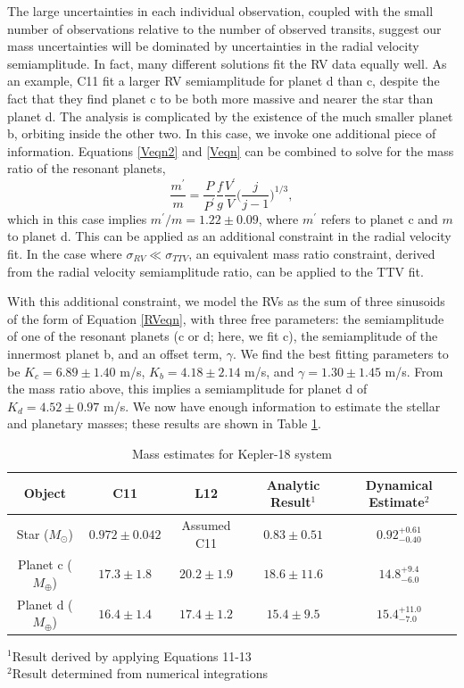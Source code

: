 The large uncertainties in each individual observation, coupled with the small number of observations relative to the number of observed transits, suggest our mass uncertainties will be dominated by uncertainties in the radial velocity semiamplitude. In fact, many different solutions fit the RV data equally well. As an example, C11 fit a larger RV semiamplitude for planet d than c, despite the fact that they find planet c to be both more massive and nearer the star than planet d. The analysis is complicated by the existence of the much smaller planet b, orbiting inside the other two. In this case, we invoke one additional piece of information. Equations \ref{Veqn2} and \ref{Veqn} can be combined to solve for the mass ratio of the resonant planets, 
\begin{equation}
\frac{m^\prime}{m} = \frac{P}{P^\prime} \frac{f}{g} \frac{V^\prime}{V} \bigg(\frac{j}{j-1}\bigg)^{1/3},
\label{Mratio}
\end{equation}
which in this case implies $m^\prime/m = 1.22 \pm 0.09$, where $m^\prime$ refers to planet c and $m$ to planet d. This can be applied as an additional constraint in the radial velocity fit. In the case where $\sigma_{RV} \ll \sigma_{TTV}$, an equivalent mass ratio constraint, derived from the radial velocity semiamplitude ratio, can be applied to the TTV fit. 

With this additional constraint, we model the RVs as the sum of three sinusoids of the form of Equation \ref{RVeqn}, with three free parameters: the semiamplitude of one of the resonant planets (c or d; here, we fit c), the semiamplitude of the innermost planet b, and an offset term, $\gamma$. We find the best fitting parameters to be $K_c = 6.89 \pm 1.40$ m/s, $K_b = 4.18 \pm 2.14$ m/s, and $\gamma = 1.30 \pm 1.45$ m/s. From the mass ratio above, this implies a semiamplitude for planet d of $K_d = 4.52 \pm 0.97$ m/s. We now have enough information to estimate the stellar and planetary masses; these results are shown in Table \ref{ExampRes}. 

\begin{table}[hbt!]
\footnotesize
\begin{center}
\begin{tabular}{ccccc}
\hline
Object & C11 & L12 & Analytic Result$^{1}$ & Dynamical Estimate$^2$ \\
\hline
        Star ($M_\odot$) & $0.972 \pm 0.042$ & Assumed C11 &  $0.83 \pm 0.51$ & $0.92 ^{+ 0.61} _{-0.40}$ \\
        Planet c ($M_\oplus$) & $17.3 \pm 1.8$ & $20.2 \pm 1.9$ & $18.6 \pm 11.6 $ & $14.8 ^{+9.4} _{-6.0}$ \\
        Planet d ($M_\oplus$) & $16.4 \pm 1.4 $ & $17.4\pm 1.2$ & $15.4 \pm 9.5 $ & $15.4 ^{+11.0} _{-7.0}$ \\
\hline
\end{tabular}
\end{center}
        $^1$Result derived by applying Equations 11-13 \\
        $^2$Result determined from numerical integrations 
        
\caption{Mass estimates for Kepler-18 system}
\label{ExampRes}
\end{table}

